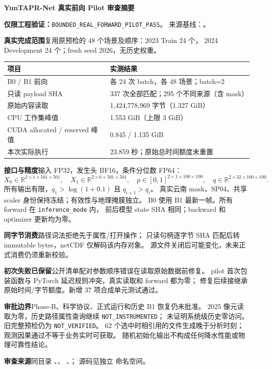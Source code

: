 \documentclass[UTF8,10pt,a4paper]{ctexart}
\begin{document}
\begin{center}\Large\bfseries YunTAPR-Net 真实前向 Pilot 审查摘要\end{center}
\textbf{仅限工程验证：}\texttt{BOUNDED\_REAL\_FORWARD\_PILOT\_PASS}。
来源基线：。

\textbf{真实完成范围}\quad 复用原预检的 48 个场景及顺序：2023 Train 24 个，
2024 Development 24 个；fresh seed 2026，无历史权重。
\begin{center}
\begin{tabular}{ll}
\toprule
项目 & 实测结果 \\
\midrule
B0 / B1 前向 & 各 24 次 batch，各 48 场景；batch=2 \\
只读 payload SHA & 337 次全部匹配；295 个不同来源（含 mask） \\
原始内容读取 & 1,424,778,969 字节（1.327 GiB） \\
CPU 工作集峰值 & 1.553 GiB（上限 3 GiB） \\
CUDA allocated / reserved 峰值 & 0.845 / 1.135 GiB \\
本次实际执行 & 23.859 秒；原始总时间额度未重置 \\
\bottomrule
\end{tabular}
\end{center}
\textbf{接口与精度}\quad 输入 FP32，发生头 BF16，条件分位数 FP64：
\[
 X_0\in\mathbb R^{2\times1\times501\times501},\quad
 X_1\in\mathbb R^{2\times6\times501\times501},\quad
 p\in[0,1]^{2\times1\times100\times100},\quad
 q\in\mathbb R^{2\times32\times100\times100}.
\]
所有输出有限，$q_1>\log(1+0.1)$ 且 $q_{i+1}>q_i$。
真实云南 mask、SP04、共享 scaler 身份保持冻结；有效性与地理掩膜独立。
B0 使用 B1 最新一帧。所有 forward 在 \texttt{inference\_mode} 内，
前后模型 state SHA 相同；backward 和 optimizer 更新均为零。

\textbf{同字节消费}\quad 路径词法拒绝先于属性/打开操作；
只读句柄逐字节 SHA 匹配后转 immutable bytes，netCDF 仅解码该内存对象。
源文件关闭后可能变化，未来正式消费仍须重新校验。

\textbf{初次失败已保留}\quad 公开清单配对参数顺序错误在读取原始数据前修复。
pilot 首次包装函数与 PyTorch 延迟规则冲突，真实读取和 forward 都为零；
修复后续接继承原始时间/字节额度。新增 37 项合成单元测试通过。

\textbf{审批边界}\quad Phase-B、科学协议、正式运行和历史 B1 恢复仍未批准。
2025 像元读取为零，历史路径属性查询继续 \texttt{NOT\_INSTRUMENTED}；
未证明系统级历史零访问。旧完整预检仍为 \texttt{NOT\_VERIFIED}。
62 个选中时相引用的文件生成晚于分析时刻；观测因果通过不等于业务实时可获取。
随机初始化输出不构成任何降水性能或物理可靠性结论。

\textbf{审查来源}\quad 同目录 、、
、；
源码见独立  命名空间。
\end{document}

